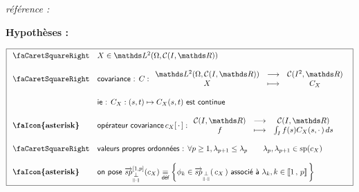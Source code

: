 
\begin{minipage}{\textwidth}
	\begin{thm}
		\emph{référence :} ~\cite[pages : 238-239-241]{kokoszka2017introduction}

		\textbf{Hypothèses :}

		\begin{equation*}
			\boxed{
				\begin{array}{ll}
					\textsf{\faCaretSquareRight} & X \in \mathds L^2( \Omega, \mathcal C(I, \mathds R))
					\\ \\
					\textsf{\faCaretSquareRight} & \textsf{covariance : } C : \begin{array}{ccc}
						                                                          \mathds L^2( \Omega, \mathcal C(I, \mathds R)) & \longrightarrow & \mathcal C(I^2, \mathds R)
						                                                          \\
						                                                          X                                              & \longmapsto     & C_X
					                                                          \end{array}
					\\ \\
					                             & \textsf{ie : } C_X : (s, t) \mapsto C_X(s,t) \textsf{ est continue}
					\\ \\
					\textbf{\faIcon{asterisk}}   & \textsf{opérateur covariance} \, c_X[ \, \cdot \, ] : \begin{array}{ccc}
						                                                                                     \mathcal C(I, \mathds R) & \longrightarrow & \mathcal C(I, \mathds R)
						                                                                                     \\
						                                                                                     f                        & \longmapsto     & \int_I f(s) C_X(s, \cdot \, ) \, ds\end{array}
					\\\\
					\textsf{\faCaretSquareRight} & \textsf{valeurs propres ordonnées : } \forall p \geq 1, \lambda_{p+1} \leq \lambda_p \quad\quad \lambda_p, \lambda_{p+1} \in \operatorname{sp}(c_X)
					\\ \\
					\textbf{\faIcon{asterisk}}   & \textsf{on pose } \overrightarrow{sp}_{\orthonormal}^{[1,p]}(c_X) \isdef \left\{ \phi_k \in \overrightarrow{sp}_{\orthonormal}( \, c_X \, ) \textsf{ associé à }  \lambda_k, k \in \intervaleint 1 p \, \right\}
				\end{array}
			}
		\end{equation*}


\end{thm}
\end{minipage}
